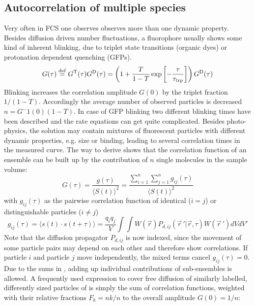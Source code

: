 \subsection{Autocorrelation of multiple species}
\label{sec:theor.autoc}
Very often in FCS one observes observes more than one dynamic property. Besides diffusion driven number fluctuations, a fluorophore usually shows some kind of inherent blinking, due to triplet state transitions (organic dyes) or protonation dependent quenching (GFPs).
	\begin{equation}
	\label{eq11}
	G(\tau) \stackrel{\rm def}{=} G^{\rm T}(\tau) G^{\rm D}(\tau) = \left( 1+ \frac{T}{1-T} \exp\left[-\frac{\tau}{\tau_{\rm trp}} \right] \right)G^{\rm D}(\tau)
	\end{equation}
Blinking increases the correlation amplitude $G(0)$ by the triplet fraction $1/(1-T)$. Accordingly the average number of observed particles is decreased $n = G^-1(0)(1-T)$. In case of GFP blinking two different blinking times have been described and the rate equations can get quite complicated.
Besides photo-physics, the solution may contain mixtures of fluorescent particles with different dynamic properties, e.g. size or binding, leading to several correlation times in the measured curve. The way to derive  shows that the correlation function of an ensemble can be built up by the contribution of $n$ single molecules in the sample volume:
	\begin{equation}
	\label{eq12}
	G(\tau) = \frac{g(\tau)}{\langle S(t) \rangle^2} = \frac{\sum_{i=1}^n \sum_{j=1}^n g_{ij}(\tau)}{\langle S(t) \rangle^2}
	\end{equation}
with $g_{ij}(\tau)$ as the pairwise correlation function of identical ($i = j$) or distinguishable particles ($i \not= j$)
	\begin{equation}
	\label{eq13}
	g_{ij}(\tau) = \langle s(t) \cdot s(t + \tau) \rangle = \frac{q_iq_j}{V} \int \int W(\vec{r}) P_{d,ij} \left( \vec{r} \,' | \vec{r},\tau \right) W(\vec{r}\,') dVdV'
	\end{equation}
Note that the diffusion propagator $P_{d,ij}$ is now indexed, since the movement of some particle pairs may depend on each other and therefore show correlations. If particle $i$ and particle $j$ move independently, the mixed terms cancel $g_{ij}(\tau) = 0$.
Due to the sums in , adding up individual contributions of sub-ensembles is allowed. A frequently used expression to cover free diffusion of similarly labelled, differently sized particles of is simply the sum of correlation functions, weighted with their relative fractions $F_k = nk/n$ to the overall amplitude $G(0) = 1/n$:

